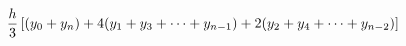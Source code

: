 \magnification{}

\nopagenumbers
$$
{h\over 3} \left[ (y_0 + y_n) 
+ 4(y_1 + y_3 + \cdots + y_{n-1}) 
+ 2(y_2 + y_4 + \cdots + y_{n-2}) \right]
$$\bye
